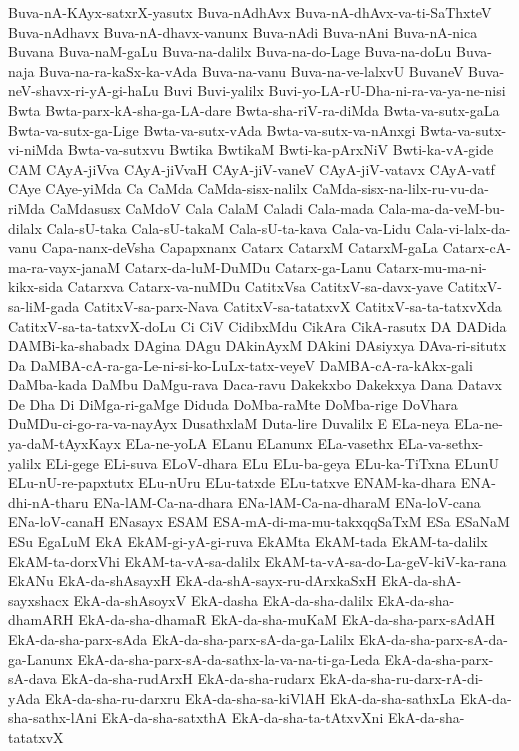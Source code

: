 {Buva-nA-KAyx-satxrX-yasutx
Buva-nAdhAvx
Buva-nA-dhAvx-va-ti-SaThxteV
Buva-nAdhavx
Buva-nA-dhavx-vanunx
Buva-nAdi
Buva-nAni
Buva-nA-nica
Buvana
Buva-naM-gaLu
Buva-na-dalilx
Buva-na-do-Lage
Buva-na-doLu
Buva-naja
Buva-na-ra-kaSx-ka-vAda
Buva-na-vanu
Buva-na-ve-lalxvU
BuvaneV
Buva-neV-shavx-ri-yA-gi-haLu
Buvi
Buvi-yalilx
Buvi-yo-LA-rU-Dha-ni-ra-va-ya-ne-nisi
Bwta
Bwta-parx-kA-sha-ga-LA-dare
Bwta-sha-riV-ra-diMda
Bwta-va-sutx-gaLa
Bwta-va-sutx-ga-Lige
Bwta-va-sutx-vAda
Bwta-va-sutx-va-nAnxgi
Bwta-va-sutx-vi-niMda
Bwta-va-sutxvu
Bwtika
BwtikaM
Bwti-ka-pArxNiV
Bwti-ka-vA-gide
CAM
CAyA-jiVva
CAyA-jiVvaH
CAyA-jiV-vaneV
CAyA-jiV-vatavx
CAyA-vatf
CAye
CAye-yiMda
Ca
CaMda
CaMda-sisx-nalilx
CaMda-sisx-na-lilx-ru-vu-da-riMda
CaMdasusx
CaMdoV
Cala
CalaM
Caladi
Cala-mada
Cala-ma-da-veM-bu-dilalx
Cala-sU-taka
Cala-sU-takaM
Cala-sU-ta-kava
Cala-va-Lidu
Cala-vi-lalx-da-vanu
Capa-nanx-deVsha
Capapxnanx
Catarx
CatarxM
CatarxM-gaLa
Catarx-cA-ma-ra-vayx-janaM
Catarx-da-luM-DuMDu
Catarx-ga-Lanu
Catarx-mu-ma-ni-kikx-sida
Catarxva
Catarx-va-nuMDu
CatitxVsa
CatitxV-sa-davx-yave
CatitxV-sa-liM-gada
CatitxV-sa-parx-Nava
CatitxV-sa-tatatxvX
CatitxV-sa-ta-tatxvXda
CatitxV-sa-ta-tatxvX-doLu
Ci
CiV
CidibxMdu
CikAra
CikA-rasutx
DA
DADida
DAMBi-ka-shabadx
DAgina
DAgu
DAkinAyxM
DAkini
DAsiyxya
DAva-ri-situtx
Da
DaMBA-cA-ra-ga-Le-ni-si-ko-LuLx-tatx-veyeV
DaMBA-cA-ra-kAkx-gali
DaMba-kada
DaMbu
DaMgu-rava
Daca-ravu
Dakekxbo
Dakekxya
Dana
Datavx
De
Dha
Di
DiMga-ri-gaMge
Diduda
DoMba-raMte
DoMba-rige
DoVhara
DuMDu-ci-go-ra-va-nayAyx
DusathxlaM
Duta-lire
Duvalilx
E
ELa-neya
ELa-ne-ya-daM-tAyxKayx
ELa-ne-yoLA
ELanu
ELanunx
ELa-vasethx
ELa-va-sethx-yalilx
ELi-gege
ELi-suva
ELoV-dhara
ELu
ELu-ba-geya
ELu-ka-TiTxna
ELunU
ELu-nU-re-papxtutx
ELu-nUru
ELu-tatxde
ELu-tatxve
ENAM-ka-dhara
ENA-dhi-nA-tharu
ENa-lAM-Ca-na-dhara
ENa-lAM-Ca-na-dharaM
ENa-loV-cana
ENa-loV-canaH
ENasayx
ESAM
ESA-mA-di-ma-mu-takxqqSaTxM
ESa
ESaNaM
ESu
EgaLuM
EkA
EkAM-gi-yA-gi-ruva
EkAMta
EkAM-tada
EkAM-ta-dalilx
EkAM-ta-dorxVhi
EkAM-ta-vA-sa-dalilx
EkAM-ta-vA-sa-do-La-geV-kiV-ka-rana
EkANu
EkA-da-shAsayxH
EkA-da-shA-sayx-ru-dArxkaSxH
EkA-da-shA-sayxshacx
EkA-da-shAsoyxV
EkA-dasha
EkA-da-sha-dalilx
EkA-da-sha-dhamARH
EkA-da-sha-dhamaR
EkA-da-sha-muKaM
EkA-da-sha-parx-sAdAH
EkA-da-sha-parx-sAda
EkA-da-sha-parx-sA-da-ga-Lalilx
EkA-da-sha-parx-sA-da-ga-Lanunx
EkA-da-sha-parx-sA-da-sathx-la-va-na-ti-ga-Leda
EkA-da-sha-parx-sA-dava
EkA-da-sha-rudArxH
EkA-da-sha-rudarx
EkA-da-sha-ru-darx-rA-di-yAda
EkA-da-sha-ru-darxru
EkA-da-sha-sa-kiVlAH
EkA-da-sha-sathxLa
EkA-da-sha-sathx-lAni
EkA-da-sha-satxthA
EkA-da-sha-ta-tAtxvXni
EkA-da-sha-tatatxvX
}
